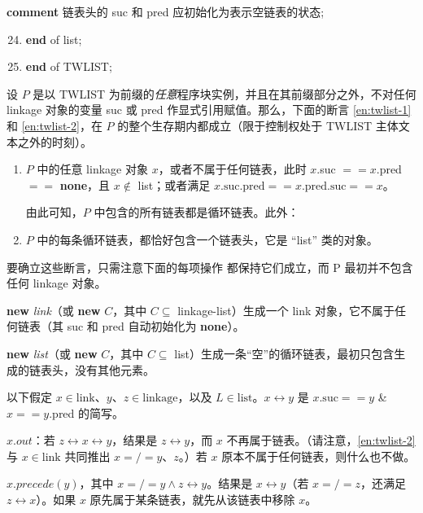 \parindent\quad \quad \quad \quad \textbf{comment} 链表头的 suc 和 pred 应初始化为表示空链表的状态;

\begin{enumerate}[nosep, label=\arabic*.]
	\setcounter{enumi}{23}

	\item \quad \textbf{end} of list;
	\item \textbf{end} of TWLIST;
\end{enumerate}

设 $P$ 是以 TWLIST 为前缀的\textit{任意}程序块实例，并且在其前缀部分之外，不对任何 linkage 对象的变量 suc 或 pred 作显式引用赋值。那么，下面的断言 \ref{en:twlist-1} 和 \ref{en:twlist-2}，在 $P$ 的整个生存期内都成立（限于控制权处于 TWLIST 主体文本之外的时刻）。

\begin{enumerate}[wide, nosep, label=(\arabic*)]
	\item \label{en:twlist-1}
	$P$ 中的任意 linkage 对象 $x$，或者不属于任何链表，此时 $x$.suc $== x$.pred $==$ \textbf{none}，且 $x \notin$ list；或者满足 $x\text{.suc.pred} == x\text{.pred.suc} == x$。
	
	由此可知，$P$ 中包含的所有链表都是循环链表。此外：
	
	\item \label{en:twlist-2}
	$P$ 中的每条循环链表，都恰好包含一个链表头，它是 ``list'' 类的对象。
\end{enumerate}

要确立这些断言，只需注意下面的每项操作
都保持它们成立，而 P 最初并不包含任何 linkage 对象。

\noindent
\textbf{new} \textit{link}（或 \textbf{new} $C$，其中 $C \subseteq$ linkage-list）生成一个 link 对象，它不属于任何链表（其 suc 和 pred 自动初始化为 \textbf{none}）。

\noindent
\textbf{new} \textit{list}（或 \textbf{new} $C$，其中 $C \subseteq$ list）生成一条“空”的循环链表，最初只包含生成的链表头，没有其他元素。

\noindent
以下假定 $x \in \text{link}$、$y$、$z \in \text{linkage}$，以及 $L \in \text{list}$。$x \leftrightarrow y$ 是 $x.\text{suc} == y$ \& $x == y$.pred 的简写。

\noindent
$x.out$：若 $z \leftrightarrow x \leftrightarrow y$，结果是 $z \leftrightarrow y$，而 $x$ 不再属于链表。（请注意，\ref{en:twlist-2} 与 $x \in \text{link}$ 共同推出 $x =/= y$、$z$。）若 $x$ 原本不属于任何链表，则什么也不做。

\noindent
$x.precede(y)$，其中 $x =/= y \land z \leftrightarrow y$。结果是 $x \leftrightarrow y$（若 $x =/= z$，还满足 $z \leftrightarrow x$）。如果 $x$ 原先属于某条链表，就先从该链表中移除 $x$。

